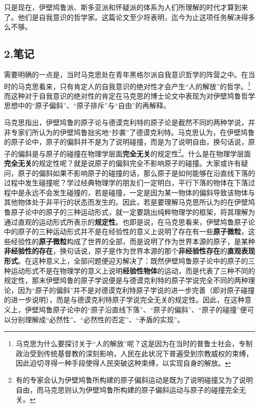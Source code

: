 \documentclass[a4paper,twoside,12pt,AutoFakeBold]{ctexart}
\begin{document}
只是现在，伊壁鸠鲁派、斯多亚派和怀疑派的体系为人们所理解的时代才算到来了。他们是自我意识的哲学家。这篇论文至少将表明，迄今为止这项任务解决得多么不够。

\newpage
\subsection{2.笔记}
需要明确的一点是，当时马克思处在青年黑格尔派自我意识哲学的阵营之中。在当时的马克思看来，只有肯定人的自我意识的绝对性才会产生“人的解放”的哲学。\footnote{马克思为什么要探讨关于“人的解放”呢？这是因为在当时的普鲁士社会，专制政治受到传统基督教的深刻影响，人民在此状况下普遍受到宗教威权的束缚，因此迫切寻得一种手段使得人民突破这种束缚，以实现自身的解放。}而这种对于自我意识的绝对性的肯定在马克思的博士论文中表现为对伊壁鸠鲁哲学思想中的“原子偏斜”、“原子排斥”与“自由”的再解释。

马克思指出，伊壁鸠鲁的原子论与德谟克利特的原子论是截然不同的两种学说，并非专家们所认为的伊壁鸠鲁拙劣地“抄袭”了德谟克利特。马克思认为，在伊壁鸠鲁的原子论中，原子的偏斜并不是为了说明碰撞，而是为了说明自由，换句话说，原子的偏斜是与原子的碰撞在物理学层面\textbf{完全无关}的规定性\footnote{有的专家会认为伊壁鸠鲁所构建的原子偏斜运动是既为了说明碰撞又为了说明自由，而马克思则认为伊壁鸠鲁所构建的原子偏斜运动与原子的碰撞完全无关。}。什么是在物理学层面\textbf{完全无关}的规定性呢？就是说原子的偏斜完全不影响原子的碰撞。大家或许有疑问，原子的偏斜如果不影响原子的碰撞的话，那么原子是如何能够在沿直线下落的过程中发生碰撞呢？学过经典物理学的朋友们一定明白，平行下落的物体在下落过程中是永远不会发生碰撞的，若是碰撞，一定是因为某一物体的偏斜导致该物体与其他物体处于非平行的状态而发生的。因此，若是要理解马克思所认为的在伊壁鸠鲁原子论中的原子的三种运动形式，就一定要跳出纯粹物理学的框架，将其理解为通过直观的运动形式所表示的\textbf{规定性}。也即是说，在马克思看来，伊壁鸠鲁原子论中的原子的三种运动形式并不是在经验性的意义上说明了存在有一些\textbf{原子微粒}，这些经验性的\textbf{原子微粒}构成了世界的全部，而是说明了作为世界本源的原子，是某种\textbf{非经验性的存在}，换句话说，原子是作为世界本源的那个\textbf{非经验性存在}的\textbf{直观表现形式}。在这种意义上，全部问题便迎刃解决了：既然伊壁鸠鲁原子论中的原子的三种运动形式不是在物理学的意义上说明\textbf{经验性物体}的运动，而是代表了三种不同的规定性，那末伊壁鸠鲁的原子学说便是与德谟克利特的原子学说完全不同的两种理论，因为“原子的偏斜”并不是对德谟克利特原子学说的进一步完善（即对原子碰撞的进一步说明），而是与德谟克利特原子学说完全无关的规定性。因此，在这种意义上，伊壁鸠鲁原子论中的“原子沿直线下落”、“原子的偏斜”、“原子的碰撞”便可以分别理解成“必然性”、“必然性的否定”、“矛盾的实现”。
\end{document}

